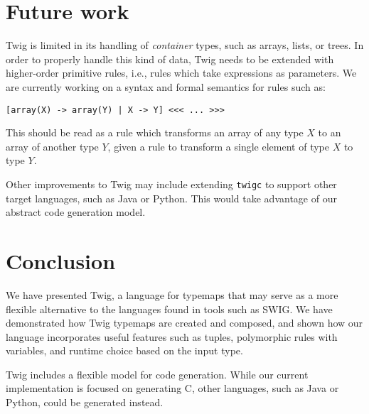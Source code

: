 
\section{Future work}

Twig is limited in its handling of \emph{container} types, such as
arrays, lists, or trees. In order to properly handle this kind of
data, Twig needs to be extended with higher-order primitive rules,
i.e., rules which take expressions as parameters. We are currently
working on a syntax and formal semantics for rules such as:

\begin{verbatim}
[array(X) -> array(Y) | X -> Y] <<< ... >>>
\end{verbatim}

This should be read as a rule which transforms an array of any
type $X$ to an array of another type $Y$, given a rule to
transform a single element of type $X$ to type $Y$.

Other improvements to Twig may include extending \texttt{twigc} to
support other target languages, such as Java or Python. This would
take advantage of our abstract code generation model.

\section{Conclusion}

We have presented Twig, a language for typemaps that may serve as
a more flexible alternative to the languages found in tools such
as SWIG. We have demonstrated how Twig typemaps are created and
composed, and shown how our language incorporates useful features
such as tuples, polymorphic rules with variables, and runtime
choice based on the input type.

Twig includes a flexible model for code generation. While our
current implementation is focused on generating C, other
languages, such as Java or Python, could be generated instead.
